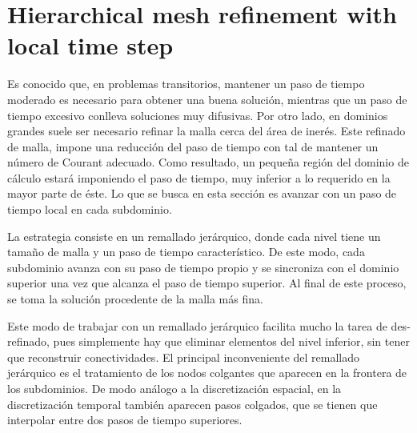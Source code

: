 
\chapter{Hierarchical mesh refinement with local time step}
\label{mesh_refinement}



Es conocido que, en problemas transitorios, mantener un paso de tiempo moderado es necesario para obtener una buena solución, mientras que un paso de tiempo excesivo conlleva soluciones muy difusivas. Por otro lado, en dominios grandes suele ser necesario refinar la malla cerca del área de inerés. Este refinado de malla, impone una reducción del paso de tiempo con tal de mantener un número de Courant adecuado. Como resultado, un pequeña región del dominio de cálculo estará imponiendo el paso de tiempo, muy inferior a lo requerido en la mayor parte de éste. Lo que se busca en esta sección es avanzar con un paso de tiempo local en cada subdominio.

La estrategia consiste en un remallado jerárquico, donde cada nivel tiene un tamaño de malla y un paso de tiempo característico. De este modo, cada subdominio avanza con su paso de tiempo propio y se sincroniza con el dominio superior una vez que alcanza el paso de tiempo superior. Al final de este proceso, se toma la solución procedente de la malla más fina.

Este modo de trabajar con un remallado jerárquico facilita mucho la tarea de des-refinado, pues simplemente hay que eliminar elementos del nivel inferior, sin tener que reconstruir conectividades. El principal inconveniente del remallado jerárquico es el tratamiento de los nodos colgantes que aparecen en la frontera de los subdominios. De modo análogo a la discretización espacial, en la discretización temporal también aparecen pasos colgados, que se tienen que interpolar entre dos pasos de tiempo superiores.


